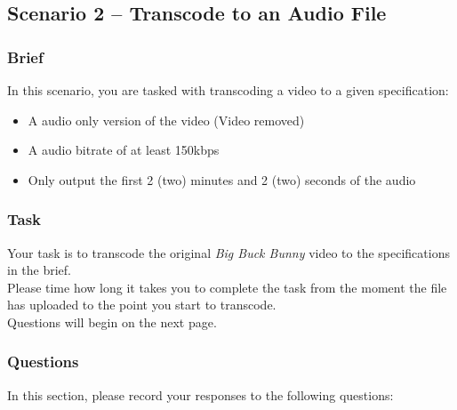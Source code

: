 \subsection{Scenario 2 – Transcode to an Audio File}
\subsubsection{Brief}
In this scenario, you are tasked with transcoding a video to a given specification:
\begin{itemize}
    \item A audio only version of the video (Video removed)
    \item A audio bitrate of at least 150kbps
    \item Only output the first 2 (two) minutes and 2 (two) seconds of the audio
\end{itemize}

\subsubsection{Task}
Your task is to transcode the original \emph{Big Buck Bunny} video to the specifications in the brief. \\
Please time how long it takes you to complete the task from the moment the file has uploaded to the point you start to transcode. \\
Questions will begin on the next page.

\clearpage

\subsubsection{Questions}

In this section, please record your responses to the following questions:
